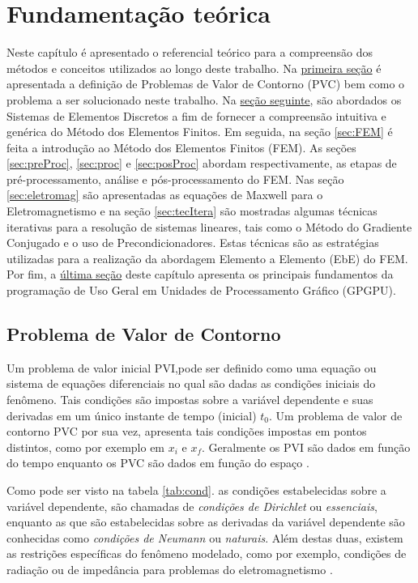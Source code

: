 \documentclass[
    12pt,               %
    openright,          %
    oneside,
    a4paper,            %
    english,            %
    french,             %
    spanish,            %
    brazil              %
    ]{abntex2}
\begin{document}
\section{Fundamentação teórica}
Neste capítulo é apresentado o referencial teórico para a compreensão dos métodos e conceitos utilizados ao longo deste trabalho. 
Na \hyperref[sec:PVC]{primeira seção} é apresentada a definição de Problemas de Valor de Contorno (PVC) bem como o problema a ser solucionado neste trabalho. 
Na \hyperref[sec:SED]{seção seguinte}, são abordados os Sistemas de Elementos Discretos a fim de fornecer a compreensão intuitiva e genérica do Método dos Elementos Finitos.
Em seguida, na seção \ref{sec:FEM} é feita a introdução ao Método dos Elementos Finitos (FEM). 
As seções \ref{sec:preProc}, \ref{sec:proc} e \ref{sec:posProc} abordam respectivamente, as etapas de pré-processamento, análise e pós-processamento do FEM.
Nas seção \ref{sec:eletromag} são apresentadas as equações de Maxwell para o Eletromagnetismo e na seção \ref{sec:tecItera} são mostradas algumas técnicas iterativas para a resolução de sistemas lineares, tais como o Método do Gradiente Conjugado e o uso de Precondicionadores. Estas técnicas são as estratégias utilizadas para a realização da abordagem Elemento a Elemento (EbE) do FEM.
Por fim, a \hyperref[sec:GPGPU]{última seção} deste capítulo apresenta os principais fundamentos da programação de Uso Geral em Unidades de Processamento Gráfico (GPGPU).

\subsection{Problema de Valor de Contorno}
\label{sec:PVC}


Um problema de valor inicial PVI,pode ser definido como uma equação ou sistema de equações diferenciais no qual são dadas as condições iniciais do fenômeno. Tais condições são impostas sobre a variável dependente e suas derivadas em um único instante de tempo (inicial) $t_0$. Um problema de valor de contorno PVC por sua vez, apresenta tais condições impostas em pontos distintos, como por exemplo em $x_i$ e $x_f$. Geralmente os PVI são dados em função do tempo enquanto os PVC são dados em função do espaço \cite{boyceDiprima}.

Como pode ser visto na tabela \ref{tab:cond}. as condições estabelecidas sobre a variável dependente, são chamadas de \textit{condições de Dirichlet} ou \textit{essenciais}, enquanto as que são estabelecidas sobre as derivadas da variável dependente são  conhecidas como \textit{condições de Neumann} ou  \textit{naturais}. Além destas duas, existem as restrições específicas do fenômeno modelado, como por exemplo, condições de radiação ou de impedância para problemas do eletromagnetismo \cite{jin}. 
\end{document}
